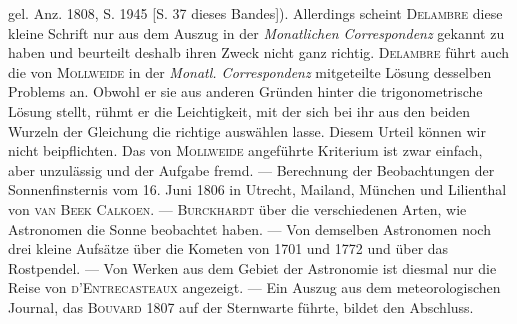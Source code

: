 gel. Anz. 1808, S. 1945 [S. 37 dieses Bandes]). Allerdings scheint \textsc{Delambre} diese kleine Schrift nur aus dem Auszug in der \emph{Monatlichen Correspondenz} gekannt zu haben und beurteilt deshalb ihren Zweck nicht ganz richtig. \textsc{Delambre} führt auch die von \textsc{Mollweide} in der \emph{Monatl. Correspondenz} mitgeteilte Lösung desselben Problems an. Obwohl er sie aus anderen Gründen hinter die trigonometrische Lösung stellt, rühmt er die Leichtigkeit, mit der sich bei ihr aus den beiden Wurzeln der Gleichung die richtige auswählen lasse. Diesem Urteil können wir nicht beipflichten. Das von \textsc{Mollweide} angeführte Kriterium ist zwar einfach, aber unzulässig und der Aufgabe fremd. — Berechnung der Beobachtungen der Sonnenfinsternis vom 16. Juni 1806 in Utrecht, Mailand, München und Lilienthal von \textsc{van Beek Calkoen}. — \textsc{Burckhardt} über die verschiedenen Arten, wie Astronomen die Sonne beobachtet haben. — Von demselben Astronomen noch drei kleine Aufsätze über die Kometen von 1701 und 1772 und über das Rostpendel. — Von Werken aus dem Gebiet der Astronomie ist diesmal nur die Reise von \textsc{d’Entrecasteaux} angezeigt. — Ein Auszug aus dem meteorologischen Journal, das \textsc{Bouvard} 1807 auf der Sternwarte führte, bildet den Abschluss.
